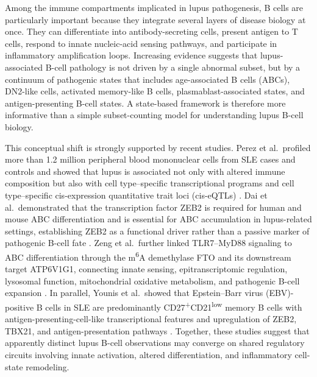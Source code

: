 Among the immune compartments implicated in lupus pathogenesis, B cells are particularly important because they integrate several layers of disease biology at once. They can differentiate into antibody-secreting cells, present antigen to T cells, respond to innate nucleic-acid sensing pathways, and participate in inflammatory amplification loops. Increasing evidence suggests that lupus-associated B-cell pathology is not driven by a single abnormal subset, but by a continuum of pathogenic states that includes age-associated B cells (ABCs), DN2-like cells, activated memory-like B cells, plasmablast-associated states, and antigen-presenting B-cell states. A state-based framework is therefore more informative than a simple subset-counting model for understanding lupus B-cell biology.

This conceptual shift is strongly supported by recent studies. Perez et al.\ profiled more than 1.2 million peripheral blood mononuclear cells from SLE cases and controls and showed that lupus is associated not only with altered immune composition but also with cell type--specific transcriptional programs and cell type--specific cis-expression quantitative trait loci (cis-eQTLs) \cite{Perez2022}. Dai et al.\ demonstrated that the transcription factor ZEB2 is required for human and mouse ABC differentiation and is essential for ABC accumulation in lupus-related settings, establishing ZEB2 as a functional driver rather than a passive marker of pathogenic B-cell fate \cite{Dai2024}. Zeng et al.\ further linked TLR7--MyD88 signaling to ABC differentiation through the m\textsuperscript{6}A demethylase FTO and its downstream target ATP6V1G1, connecting innate sensing, epitranscriptomic regulation, lysosomal function, mitochondrial oxidative metabolism, and pathogenic B-cell expansion \cite{Zeng2025}. In parallel, Younis et al.\ showed that Epstein--Barr virus (EBV)-positive B cells in SLE are predominantly CD27\textsuperscript{+}CD21\textsuperscript{low} memory B cells with antigen-presenting-cell-like transcriptional features and upregulation of ZEB2, TBX21, and antigen-presentation pathways \cite{Younis2025}. Together, these studies suggest that apparently distinct lupus B-cell observations may converge on shared regulatory circuits involving innate activation, altered differentiation, and inflammatory cell-state remodeling.

